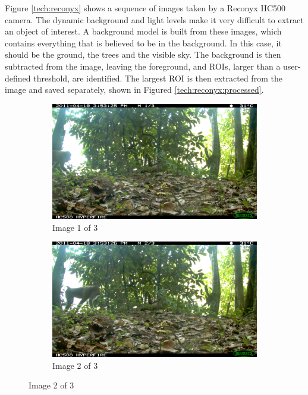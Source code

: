 		Figure \ref{tech:reconyx} shows a sequence of images taken by a Reconyx HC500 camera. The dynamic background and light levels make it very difficult to extract an object of interest. A background model is built from these images, which contains everything that is believed to be in the background. In this case, it should be the ground, the trees and the visible sky. The background is then subtracted from the image, leaving the foreground, and ROIs, larger than a user-defined threshold, are identified. The largest ROI is then extracted from the image and saved separately, shown in Figured \ref{tech:reconyx:processed}.

\begin{figure}[ht!]
\centering
\begin{subfigure}[b]{0.5\textwidth}
  \centering
  \includegraphics[width=\textwidth]{Chap3/figures/IMG_0568}
  \caption{Image 1 of 3}
\end{subfigure}%
\begin{subfigure}[b]{0.5\textwidth}
  \centering
\includegraphics[width=\textwidth]{Chap3/figures/IMG_0569}
  \caption{Image 2 of 3}
\end{subfigure}

\end{figure}
